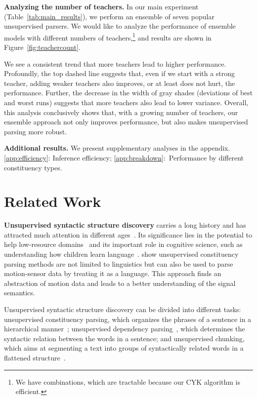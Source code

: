 \documentclass{article}
\begin{document}
\textbf{Analyzing the number of teachers.} In our main experiment (Table~\ref{tab:main_results}), we perform an ensemble of seven popular unsupervised parsers. We would like to analyze the performance of ensemble models with different numbers of teachers,\footnote{We have  combinations, which are tractable because our CYK algorithm is efficient.} and results are shown in Figure~\ref{fig:teachercount}.

We see a consistent trend that more teachers lead to higher performance. Profoundly, the top dashed line suggests that, even if we start with a strong teacher, adding weaker teachers also improves, or at least does not hurt, the performance. Further, the decrease in the width of gray shades (deviations of best and worst runs) suggests that more teachers also lead to lower variance. Overall, this analysis conclusively shows that, with a growing number of teachers, our ensemble approach not only improves performance, but also makes unsupervised parsing more robust.

\textbf{Additional results.} We present supplementary analyses in the appendix. \ref{app:efficiency}: Inference efficiency; \ref{app:breakdown}:~Performance by different constituency types.


\section{Related Work}
\textbf{Unsupervised syntactic structure discovery} carries a long history and has attracted much attention in different ages~\citep{klein2005unsupervised,shen2018ordered,li-lu-2023-contextual}. Its significance lies in the potential to help low-resource domains~\citep{kann-etal-2019-neural} and its important role in cognitive science, such as understanding how children learn language~\citep{Exemplar2Grammar}.
\citet{6137337} show unsupervised constituency parsing methods are not limited to linguistics but can also be used to parse motion-sensor data by treating it as a language. This approach finds an abstraction of motion data and leads to a better understanding of the signal semantics.

Unsupervised syntactic structure discovery can be divided into different tasks: unsupervised constituency parsing, which  organizes the phrases of a sentence in a hierarchical manner~\citep{constituencyTree}; unsupervised dependency parsing~\citep{nivre2010dependency, naseem2010using, han-etal-2020-survey}, which determines the syntactic relation between the words in a sentence; and 
unsupervised chunking, which aims at segmenting a text into groups of syntactically related words in a flattened structure~\citep{deshmukh-etal-2021-unsupervised-chunking, wu2023unsupervised}.
\end{document}
